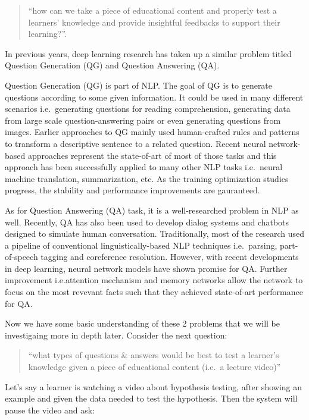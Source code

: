 \documentclass[]{book}
\theoremstyle{definition}
\theoremstyle{definition}
\theoremstyle{definition}
\theoremstyle{remark}
\begin{document}
\begin{quote}
``how can we take a piece of educational content and properly test a
learners' knowledge and provide insightful feedbacks to support their
learning?''.
\end{quote}

In previous years, deep learning research has taken up a similar problem
titled Question Generation (QG) and Question Answering (QA).

Question Generation (QG) is part of NLP. The goal of QG is to generate
questions according to some given information. It could be used in many
different scenarios i.e.~generating questions for reading comprehension,
generating data from large scale question-answering pairs or even
generating questions from images. Earlier approaches to QG mainly used
human-crafted rules and patterns to transform a descriptive sentence to
a related question. Recent neural network-based approaches represent the
state-of-art of most of those tasks and this approach has been
successfully applied to many other NLP tasks i.e.~neural machine
translation, summarization, etc. As the training optimization studies
progress, the stability and performance improvements are gauranteed.

As for Question Answering (QA) task, it is a well-researched problem in
NLP as well. Recently, QA has also been used to develop dialog systems
and chatbots designed to simulate human conversation. Traditionally,
most of the research used a pipeline of conventional
linguistically-based NLP techniques i.e.~parsing, part-of-speech tagging
and coreference resolution. However, with recent developments in deep
learning, neural network models have shown promise for QA. Further
improvement i.e.attention mechanism and memory networks allow the
network to focus on the most revevant facts such that they achieved
state-of-art performance for QA.

Now we have some basic understanding of these 2 problems that we will be
investigaing more in depth later. Consider the next question:

\begin{quote}
``what types of questions \& answers would be best to test a learner's
knowledge given a piece of educational content (i.e.~a lecture video)''
\end{quote}

Let's say a learner is watching a video about hypothesis testing, after
showing an example and given the data needed to test the hypothesis.
Then the system will pause the video and ask:
\end{document}
